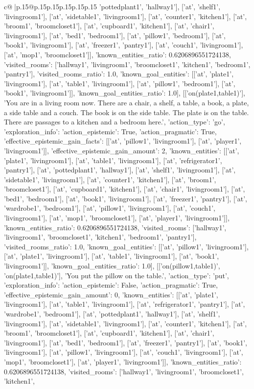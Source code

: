 \documentclass{article}
\begin{document}
{\begin{supertabular}{c@{$\;$}|p{.15\linewidth}@{}p{.15\linewidth}p{.15\linewidth}p{.15\linewidth}p{.15\linewidth}p{.15\linewidth}}
{{{'pottedplant1', 'hallway1'], ['at', 'shelf1', 'livingroom1'], ['at', 'sidetable1', 'livingroom1'], ['at', 'counter1', 'kitchen1'], ['at', 'broom1', 'broomcloset1'], ['at', 'cupboard1', 'kitchen1'], ['at', 'chair1', 'livingroom1'], ['at', 'bed1', 'bedroom1'], ['at', 'pillow1', 'bedroom1'], ['at', 'book1', 'livingroom1'], ['at', 'freezer1', 'pantry1'], ['at', 'couch1', 'livingroom1'], ['at', 'mop1', 'broomcloset1']], 'known_entities_ratio': 0.6206896551724138, 'visited_rooms': ['hallway1', 'livingroom1', 'broomcloset1', 'kitchen1', 'bedroom1', 'pantry1'], 'visited_rooms_ratio': 1.0, 'known_goal_entities': [['at', 'plate1', 'livingroom1'], ['at', 'table1', 'livingroom1'], ['at', 'pillow1', 'bedroom1'], ['at', 'book1', 'livingroom1']], 'known_goal_entities_ratio': 1.0}}], [['on(plate1,table1)'], 'You are in a living room now. There are a chair, a shelf, a table, a book, a plate, a side table and a couch. The book is on the side table. The plate is on the table. There are passages to a kitchen and a bedroom here.', {'action_type': 'go', 'exploration_info': {'action_epistemic': True, 'action_pragmatic': True, 'effective_epistemic_gain_facts': [['at', 'pillow1', 'livingroom1'], ['at', 'player1', 'livingroom1']], 'effective_epistemic_gain_amount': 2, 'known_entities': [['at', 'plate1', 'livingroom1'], ['at', 'table1', 'livingroom1'], ['at', 'refrigerator1', 'pantry1'], ['at', 'pottedplant1', 'hallway1'], ['at', 'shelf1', 'livingroom1'], ['at', 'sidetable1', 'livingroom1'], ['at', 'counter1', 'kitchen1'], ['at', 'broom1', 'broomcloset1'], ['at', 'cupboard1', 'kitchen1'], ['at', 'chair1', 'livingroom1'], ['at', 'bed1', 'bedroom1'], ['at', 'book1', 'livingroom1'], ['at', 'freezer1', 'pantry1'], ['at', 'wardrobe1', 'bedroom1'], ['at', 'pillow1', 'livingroom1'], ['at', 'couch1', 'livingroom1'], ['at', 'mop1', 'broomcloset1'], ['at', 'player1', 'livingroom1']], 'known_entities_ratio': 0.6206896551724138, 'visited_rooms': ['hallway1', 'livingroom1', 'broomcloset1', 'kitchen1', 'bedroom1', 'pantry1'], 'visited_rooms_ratio': 1.0, 'known_goal_entities': [['at', 'pillow1', 'livingroom1'], ['at', 'plate1', 'livingroom1'], ['at', 'table1', 'livingroom1'], ['at', 'book1', 'livingroom1']], 'known_goal_entities_ratio': 1.0}}], [['on(pillow1,table1)', 'on(plate1,table1)'], 'You put the pillow on the table.', {'action_type': 'put', 'exploration_info': {'action_epistemic': False, 'action_pragmatic': True, 'effective_epistemic_gain_amount': 0, 'known_entities': [['at', 'plate1', 'livingroom1'], ['at', 'table1', 'livingroom1'], ['at', 'refrigerator1', 'pantry1'], ['at', 'wardrobe1', 'bedroom1'], ['at', 'pottedplant1', 'hallway1'], ['at', 'shelf1', 'livingroom1'], ['at', 'sidetable1', 'livingroom1'], ['at', 'counter1', 'kitchen1'], ['at', 'broom1', 'broomcloset1'], ['at', 'cupboard1', 'kitchen1'], ['at', 'chair1', 'livingroom1'], ['at', 'bed1', 'bedroom1'], ['at', 'freezer1', 'pantry1'], ['at', 'book1', 'livingroom1'], ['at', 'pillow1', 'livingroom1'], ['at', 'couch1', 'livingroom1'], ['at', 'mop1', 'broomcloset1'], ['at', 'player1', 'livingroom1']], 'known_entities_ratio': 0.6206896551724138, 'visited_rooms': ['hallway1', 'livingroom1', 'broomcloset1', 'kitchen1', }}}
\end{supertabular}}
\end{document}
